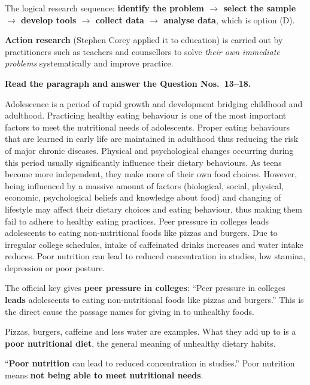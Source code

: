 The logical research sequence: \textbf{identify the problem $\rightarrow$ select the sample $\rightarrow$ develop tools $\rightarrow$ collect data $\rightarrow$ analyse data}, which is option (D).

\textbf{Action research} (Stephen Corey applied it to education) is carried out by practitioners such as teachers and counsellors to solve \emph{their own immediate problems} systematically and improve practice.

\textbf{Read the paragraph and answer the Question Nos.~13--18.}\par\smallskip
Adolescence is a period of rapid growth and development bridging childhood and adulthood. Practicing healthy eating behaviour is one of the most important factors to meet the nutritional needs of adolescents. Proper eating behaviours that are learned in early life are maintained in adulthood thus reducing the risk of major chronic diseases. Physical and psychological changes occurring during this period usually significantly influence their dietary behaviours. As teens become more independent, they make more of their own food choices. However, being influenced by a massive amount of factors (biological, social, physical, economic, psychological beliefs and knowledge about food) and changing of lifestyle may affect their dietary choices and eating behaviour, thus making them fail to adhere to healthy eating practices. Peer pressure in colleges leads adolescents to eating non-nutritional foods like pizzas and burgers. Due to irregular college schedules, intake of caffeinated drinks increases and water intake reduces. Poor nutrition can lead to reduced concentration in studies, low stamina, depression or poor posture.

The official key gives \textbf{peer pressure in colleges}: ``Peer pressure in colleges \textbf{leads} adolescents to eating non-nutritional foods like pizzas and burgers.'' This is the direct cause the passage names for giving in to unhealthy foods.

Pizzas, burgers, caffeine and less water are examples. What they add up to is a \textbf{poor nutritional diet}, the general meaning of unhealthy dietary habits.

``\textbf{Poor nutrition} can lead to reduced concentration in studies.'' Poor nutrition means \textbf{not being able to meet nutritional needs}.


